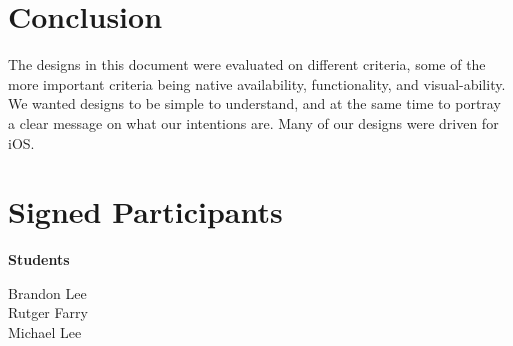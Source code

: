 \documentclass[letterpaper,10pt,titlepage]{article}
\begin{document}
\section{Conclusion}
The designs in this document were evaluated on different criteria, some of the more important criteria being native availability, functionality, and visual-ability. We wanted designs to be simple to understand, and at the same time to portray a clear message on what our intentions are. Many of our designs were driven for iOS.\\


\newpage

\section{Signed Participants}

\textbf{Students}

Brandon Lee\\
Rutger Farry\\
Michael Lee\\
\end{document}
